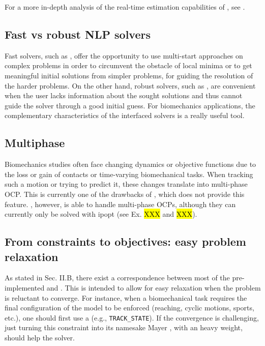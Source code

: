 For a more in-depth analysis of the real-time estimation capabilities of \bioptim, see \cite{bailly2020real}.


\subsection{Fast vs robust NLP solvers}

Fast solvers, such as \acados, offer the opportunity to use multi-start approaches on complex problems in order to circumvent the obstacle of local minima \cite{huchez2015local, bailly2020optimal} or to get meaningful initial solutions from simpler problems, for guiding the resolution of the harder problems.
On the other hand, robust solvers, such as \ipopt, are convenient when the user lacks information about the sought solutions and thus cannot guide the solver through a good initial guess.
For biomechanics applications, the complementary characteristics of the interfaced solvers is a really useful tool.

\subsection{Multiphase}

Biomechanics studies often face changing dynamics or objective functions due to the loss or gain of contacts or time-varying biomechanical tasks.
When tracking such a motion or trying to predict it, these changes translate into multi-phase OCP.
This is currently one of the drawbacks of \moco, which does not provide this feature.
\bioptim, however, is able to handle multi-phase OCPs, although they can currently only be solved with ipopt (see Ex. \hl{XXX} and \hl{XXX}).


\subsection{From constraints to objectives: easy problem relaxation}

As stated in Sec. II.B, there exist a correspondence between most of the pre-implemented \constraints and \objectives.
This is intended to allow for easy relaxation when the problem is reluctant to converge. 
For instance, when a biomechanical task requires the final configuration of the model to be enforced (reaching, cyclic motions, sports, etc.), one should first use a \constraint (e.g., \texttt{TRACK\_STATE}).
If the convergence is challenging, just turning this constraint into its namesake Mayer \objective, with an heavy weight, should help the solver.

